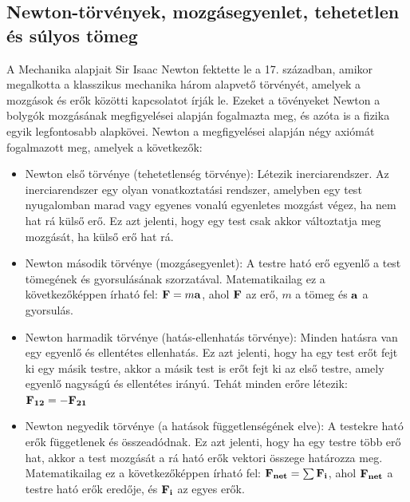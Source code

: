 \documentclass[a4paper,12pt]{article}
\begin{document}
\subsection{Newton-törvények, mozgásegyenlet, tehetetlen és súlyos tömeg}
A Mechanika alapjait Sir Isaac Newton fektette le a 17. században, amikor megalkotta a klasszikus mechanika három alapvető törvényét, amelyek a mozgások és erők közötti kapcsolatot írják le. Ezeket a tövényeket Newton a bolygók mozgásának megfigyelései alapján fogalmazta meg,
és azóta is a fizika egyik legfontosabb alapkövei. Newton a megfigyelései alapján négy axiómát fogalmazott meg, amelyek a következők:
\begin{itemize}
    \item Newton első törvénye (tehetetlenség törvénye): Létezik inerciarendszer. Az inerciarendszer egy olyan vonatkoztatási rendszer, amelyben egy test nyugalomban marad vagy egyenes vonalú egyenletes mozgást végez, ha nem hat rá külső erő. Ez azt jelenti, hogy egy test csak akkor változtatja meg mozgását, ha külső erő hat rá.
    \item Newton második törvénye (mozgásegyenlet): A testre ható erő egyenlő a test tömegének és gyorsulásának szorzatával. Matematikailag ez a következőképpen írható fel: $\bold{F} = m\bold{a}$, ahol $\bold{F}$ az erő, $m$ a tömeg és $\bold{a}$ a gyorsulás.
    \item Newton harmadik törvénye (hatás-ellenhatás törvénye): Minden hatásra van egy egyenlő és ellentétes ellenhatás. Ez azt jelenti, hogy ha egy test erőt fejt ki egy másik testre, akkor a másik test is erőt fejt ki az első testre, amely egyenlő nagyságú és ellentétes irányú. Tehát minden erőre létezik: $\bold{F_{12}} = - \bold{F_{21}}$
    \item Newton negyedik törvénye (a hatások függetlenségének elve): A testekre ható erők függetlenek és összeadódnak. Ez azt jelenti, hogy ha egy testre több erő hat, akkor a test mozgását a rá ható erők vektori összege határozza meg. Matematikailag ez a következőképpen írható fel: $\bold{F_{net}} = \sum \bold{F_i}$, ahol $\bold{F_{net}}$ a testre ható erők eredője, és $\bold{F_i}$ az egyes erők.
\end{itemize}
\end{document}
